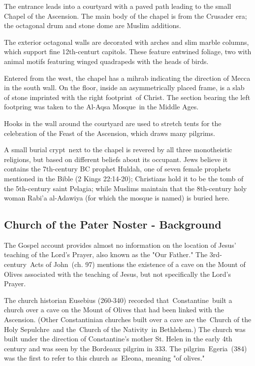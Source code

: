 \documentclass[letterpaper]{report}
\begin{document}
\begin{multicols}{2}
The entrance leads into a courtyard with a paved path leading to the small Chapel of the Ascension. The main body of the chapel is from the Crusader era; the octagonal drum and stone dome are Muslim additions.

The exterior octagonal walls are decorated with arches and slim marble columns, which support fine 12th-centurt capitols. These feature entwined foliage, two with animal motifs featuring winged quadrapeds with the heads of birds.

Entered from the west, the chapel has a mihrab indicating the direction of Mecca in the south wall. On the floor, inside an asymmetrically placed frame, is a slab of stone imprinted with the right footprint of Christ. The section bearing the left footpring was taken to the Al-Aqsa Mosque in the Middle Ages.

Hooks in the wall around the courtyard are used to stretch tents for the celebration of the Feast of the Ascension, which draws many pilgrims.

A small burial crypt next to the chapel is revered by all three monotheistic religions, but based on different beliefs about its occupant. Jews believe it contains the 7th-century BC prophet Huldah, one of seven female prophets mentioned in the Bible (2 Kings 22:14-20); Christians hold it to be the tomb of the 5th-century saint Pelagia; while Muslims maintain that the 8th-century holy woman Rabi'a al-Adawiya (for which the mosque is named) is buried here.

\subsection{Church of the Pater Noster - Background}

The Gospel account provides almost no information on the location of Jesus' teaching of the Lord's Prayer, also known as the "Our Father." The 3rd-century Acts of John (ch. 97) mentions the existence of a cave on the Mount of Olives associated with the teaching of Jesus, but not specifically the Lord's Prayer.

The church historian Eusebius (260-340) recorded that Constantine built a church over a cave on the Mount of Olives that had been linked with the Ascension. (Other Constantinian churches built over a cave are the Church of the Holy Sepulchre and the Church of the Nativity in Bethlehem.) The church was built under the direction of Constantine's mother St. Helen in the early 4th century and was seen by the Bordeaux pilgrim in 333. The pilgrim Egeria (384) was the first to refer to this church as Eleona, meaning "of olives."


\end{multicols}
\end{document}
